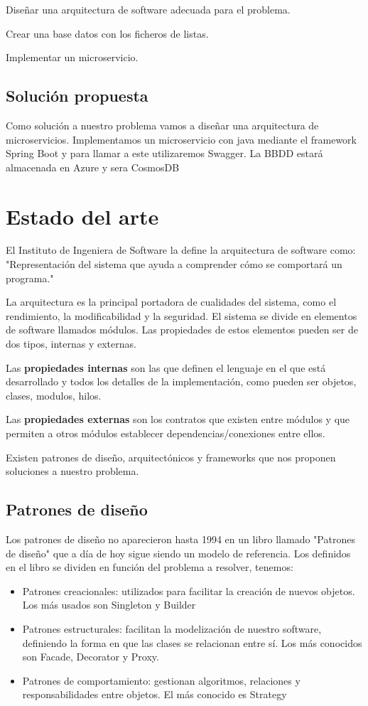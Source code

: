 \documentclass[12pt]{report} %
\begin{document}
	Diseñar una arquitectura de software adecuada para el problema.
	
	Crear una base datos con los ficheros de listas.
	
	Implementar un microservicio.
	
	
	\subsection{Solución propuesta}
	Como solución a nuestro problema vamos a diseñar una arquitectura de microservicios.
	Implementamos un microservicio con java mediante el framework Spring Boot y para llamar a este utilizaremos Swagger.
	La BBDD estará almacenada en Azure y sera CosmosDB
	\section{Estado del arte}
	
	El Instituto de Ingeniera de Software la define la arquitectura de software como:
	"Representación del sistema que ayuda a comprender cómo se comportará un programa." 
	
	La arquitectura es la principal portadora de cualidades del sistema, como el rendimiento, la modificabilidad y la seguridad. El sistema se divide en elementos de software llamados módulos. Las propiedades de estos elementos pueden ser de dos tipos, internas y externas.
	
	Las \textbf{propiedades internas}  son las que definen el lenguaje en el que está desarrollado y todos los detalles de la implementación, como pueden ser objetos, clases, modulos, hilos.
	
	Las \textbf{propiedades externas} son los contratos que existen entre módulos y que permiten a otros módulos establecer dependencias/conexiones entre ellos.
	
	Existen patrones de diseño, arquitectónicos y frameworks que nos proponen soluciones a nuestro problema.
	
	\subsection{Patrones de diseño}
	
	Los patrones de diseño no aparecieron hasta 1994 en un libro llamado "Patrones de diseño" que a día de hoy sigue siendo un modelo de referencia.		 
	Los definidos en el libro se dividen en función del problema a resolver, tenemos:
	
	\begin{itemize}
		\item Patrones creacionales: utilizados para facilitar la creación de nuevos objetos. Los más usados son Singleton y Builder
		\item Patrones estructurales: facilitan la modelización de nuestro software, definiendo la forma en que las clases se relacionan entre sí. Los más conocidos son Facade, Decorator y Proxy.
		\item Patrones de comportamiento: gestionan algoritmos, relaciones y responsabilidades entre objetos. El más conocido es Strategy 	
	\end{itemize}
	
\end{document}
